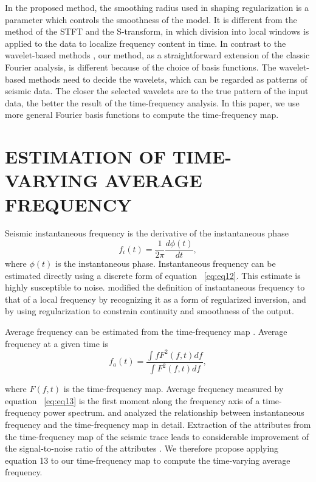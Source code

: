 
In the proposed method, the smoothing radius used in shaping
regularization is a parameter which controls the smoothness of
the model. It is different from the method of the STFT and the
S-transform, in which division into local windows is applied to
the data to localize frequency content in time. In contrast to the
wavelet-based methods \cite[]{Chakraborty1995, Sinha2005, Wang2007}, our method, as a straightforward extension
of the classic Fourier analysis, is different because of the choice
of basis functions. The wavelet-based methods need to decide the
wavelets, which can be regarded as patterns of seismic data. The
closer the selected wavelets are to the true pattern of the input data,
the better the result of the time-frequency analysis. In this paper, we
use more general Fourier basis functions to compute the time-frequency
map.

\section{ESTIMATION OF TIME-VARYING AVERAGE FREQUENCY}

Seismic instantaneous frequency is the derivative of the instantaneous
phase
      \begin{equation}
          f_{i}(t)=\frac{1}{2\pi}\frac{d\phi (t)}{dt},
        \label{eq:eq12}
      \end{equation}
where $\phi (t)$ is the instantaneous phase. Instantaneous frequency can
be estimated directly using a discrete form of equation ~\ref{eq:eq12}. This
estimate is highly susceptible to noise. \cite{Fomel2007a} modified
the definition of instantaneous frequency to that of a local frequency
by recognizing it as a form of regularized inversion, and by using
regularization to constrain continuity and smoothness of the output.

Average frequency can be estimated from the time-frequency
map \cite[]{Claasen1980,Cohen1989, Hlawatsch1992, Steeghs2001, Sinha2009}. 
Average frequency at a given time is
      \begin{equation}
          f_{a}(t)=\frac{\int fF^{2}(f,t)df}{\int F^{2}(f,t)df},
        \label{eq:eq13}
      \end{equation}

where $F(f,t)$ is the time-frequency map. Average frequency measured
by equation ~\ref{eq:eq13} is the first moment along the frequency axis of
a time-frequency power spectrum. \cite{Saha1987} and \cite{Brian1993}
analyzed the relationship between instantaneous frequency
and the time-frequency map in detail. Extraction of the attributes
from the time-frequency map of the seismic trace leads to considerable
improvement of the signal-to-noise ratio of the attributes
\cite[]{Steeghs2001}. We therefore propose applying
equation 13 to our time-frequency map to compute the time-varying
average frequency.

